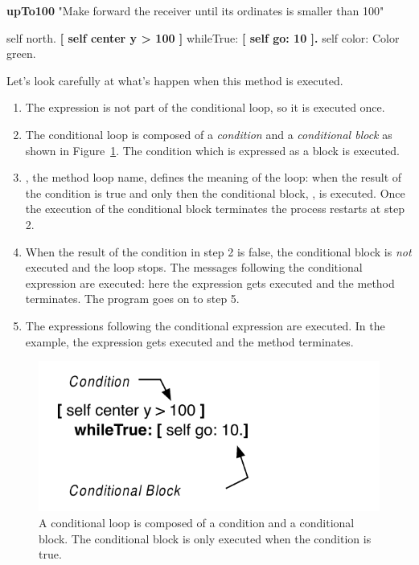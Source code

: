 \begin{method}\label{mth:upto}
\textbf{upTo100}
   "Make forward the receiver until its ordinates is smaller than 100"

   self north.
   \textbf{[ self center y > 100 ]}
      whileTrue: \textbf{[ self go: 10 ].}
   self color: Color green.
\end{method}






Let's look carefully at what's happen when this method is executed. 
\begin{enumerate}
\item The expression  is not part of the conditional loop, so it is executed once. 

\item The conditional loop is composed of  a \emph{condition} and a \emph{conditional block} as shown in Figure~\ref{fig:conditionalLoopsPicturehere2}. 
The condition which is expressed as a block  is executed. 

\item {}, the method loop name,  defines the meaning of the loop:  when the result of the condition is true and only then the conditional block,  \ct{[ self go: 10 ]}, is executed. Once the execution of the conditional block terminates the process restarts at step 2.

\item When the result of the condition  in step 2 is false, the conditional block is \textit{not} executed and the loop stops. The messages following the conditional expression are executed: here the expression  gets executed and the method terminates. The program goes on to step 5.

\item The expressions following the conditional expression are executed. In the example, the expression  gets executed and the method terminates. 
\end{enumerate}


\begin{figure}[h]
\begin{center}\includegraphics{conditionalLoopsPicture2}
\caption{A  conditional loop is composed of a condition and a conditional block. The conditional block is only executed when the condition is true. \label{fig:conditionalLoopsPicturehere2}}
\end{center}
\end{figure}


